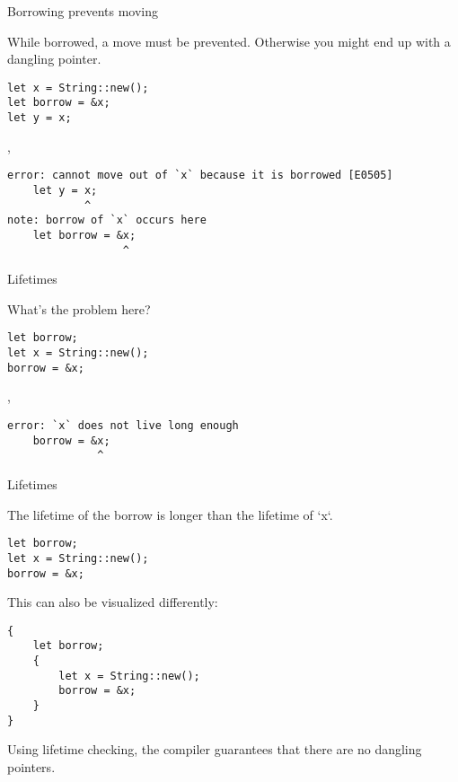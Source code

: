 
\begin{frame}[fragile]{Borrowing prevents moving}

While borrowed, a move must be prevented. Otherwise you might end up with a
dangling pointer.

\begin{verbatim}
let x = String::new();
let borrow = &x;
let y = x;
\end{verbatim}

\sep

\begin{verbatim}
error: cannot move out of `x` because it is borrowed [E0505]
    let y = x;
            ^
note: borrow of `x` occurs here
    let borrow = &x;
                  ^
\end{verbatim}

\end{frame}


\begin{frame}[fragile]{Lifetimes}

What's the problem here?

\begin{verbatim}
let borrow;
let x = String::new();
borrow = &x;
\end{verbatim}

\sep

\begin{verbatim}
error: `x` does not live long enough
    borrow = &x;
              ^
\end{verbatim}

\end{frame}


\begin{frame}[fragile]{Lifetimes}

The lifetime of the borrow is longer than the lifetime of `x`.

\begin{verbatim}
let borrow;
let x = String::new();
borrow = &x;
\end{verbatim}

This can also be visualized differently:

\begin{verbatim}
{
    let borrow;
    {
        let x = String::new();
        borrow = &x;
    }
}
\end{verbatim}

Using lifetime checking, the compiler guarantees that there are no dangling
pointers.

\end{frame}
